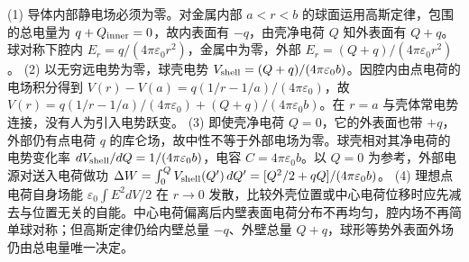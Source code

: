 (1) 导体内部静电场必须为零。对金属内部 \(a<r<b\) 的球面运用高斯定律，包围的总电量为 \(q+Q_{\rm inner}=0\)，故内表面有 \(-q\)，由壳净电荷 \(Q\) 知外表面有 \(Q+q\)。球对称下腔内 \(E_r=q/(4\pi\varepsilon_0r^2)\)，金属中为零，外部 \(E_r=(Q+q)/(4\pi\varepsilon_0r^2)\)。
(2) 以无穷远电势为零，球壳电势 \(V_{\rm shell}=(Q+q)/(4\pi\varepsilon_0b)\)。因腔内由点电荷的电场积分得到 \(V(r)-V(a)=q(1/r-1/a)/(4\pi\varepsilon_0)\)，故 \(V(r)=q(1/r-1/a)/(4\pi\varepsilon_0)+(Q+q)/(4\pi\varepsilon_0b)\)。在 \(r=a\) 与壳体常电势连接，没有人为引入电势跃变。
(3) 即使壳净电荷 \(Q=0\)，它的外表面也带 \(+q\)，外部仍有点电荷 \(q\) 的库仑场，故中性不等于外部电场为零。球壳相对其净电荷的电势变化率 \(dV_{\rm shell}/dQ=1/(4\pi\varepsilon_0b)\)，电容 \(C=4\pi\varepsilon_0b\)。以 \(Q=0\) 为参考，外部电源对送入电荷做功 \(\Delta W=\int_0^QV_{\rm shell}(Q')\,dQ'=[Q^2/2+qQ]/(4\pi\varepsilon_0b)\)。
(4) 理想点电荷自身场能 \(\varepsilon_0\int E^2dV/2\) 在 \(r\to0\) 发散，比较外壳位置或中心电荷位移时应先减去与位置无关的自能。中心电荷偏离后内壁表面电荷分布不再均匀，腔内场不再简单球对称；但高斯定律仍给内壁总量 \(-q\)、外壁总量 \(Q+q\)，球形等势外表面外场仍由总电量唯一决定。
